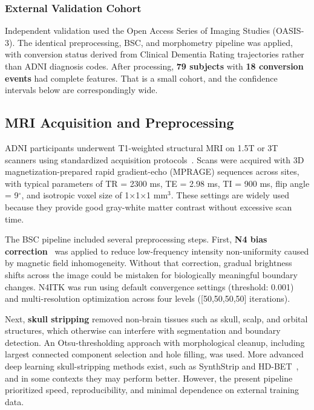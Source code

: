 \documentclass[blue]{ludusofficial}  %
\begin{document}
\subsubsection{External Validation Cohort}

Independent validation used the Open Access Series of Imaging Studies (OASIS-3). The identical preprocessing, BSC, and morphometry pipeline was applied, with conversion status derived from Clinical Dementia Rating trajectories rather than ADNI diagnosis codes. After processing, \textbf{79 subjects} with \textbf{18 conversion events} had complete features. That is a small cohort, and the confidence intervals below are correspondingly wide.

\subsection{MRI Acquisition and Preprocessing}

ADNI participants underwent T1-weighted structural MRI on 1.5T or 3T scanners using standardized acquisition protocols~\cite{jack2008adni_mri}. Scans were acquired with 3D magnetization-prepared rapid gradient-echo (MPRAGE) sequences across sites, with typical parameters of TR = 2300 ms, TE = 2.98 ms, TI = 900 ms, flip angle = 9$^\circ$, and isotropic voxel size of 1$\times$1$\times$1 mm$^3$. These settings are widely used because they provide good gray-white matter contrast without excessive scan time.

The BSC pipeline included several preprocessing steps. First, \textbf{N4 bias correction}~\cite{tustison2010n4} was applied to reduce low-frequency intensity non-uniformity caused by magnetic field inhomogeneity. Without that correction, gradual brightness shifts across the image could be mistaken for biologically meaningful boundary changes. N4ITK was run using default convergence settings (threshold: 0.001) and multi-resolution optimization across four levels ([50,50,50,50] iterations).

Next, \textbf{skull stripping} removed non-brain tissues such as skull, scalp, and orbital structures, which otherwise can interfere with segmentation and boundary detection. An Otsu-thresholding approach with morphological cleanup, including largest connected component selection and hole filling, was used. More advanced deep learning skull-stripping methods exist, such as SynthStrip and HD-BET~\cite{hoopes2022synthstrip}, and in some contexts they may perform better. However, the present pipeline prioritized speed, reproducibility, and minimal dependence on external training data.
\end{document}
